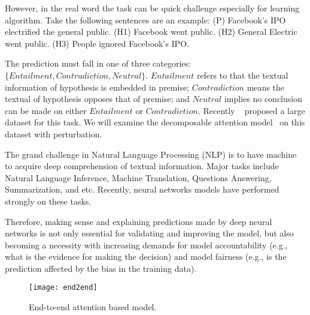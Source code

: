 However, in the real word the task can be quick challenge especially for learning algorithm. Take the following sentences are an example:  (P) Facebook's IPO electrified the general public. (H1) Facebook went public. (H2) General Electric went public. (H3) People ignored Facebook's IPO.

The prediction must fall in one of three categories: $\{Entailment, Contradiction, Neutral\}$.
$Entailment$ refers to that the textual information of hypothesis is embedded in premise;
$Contradiction$ means the textual of hypothesis opposes that of premise;
and $Neutral$ implies no conclusion can be made on either $Entailment$ or $Contradiction$.
%
Recently ~\cite{BowmanAngeliPotts2015} proposed a large dataset for this task. We will examine
the decomposable attention model~\cite{parikh2016emnlp} on this dataset with perturbation.


The grand challenge in Natural Language Processing (NLP) is to have machine to acquire
deep comprehension of textual information. Major tasks include Natural Language Inference,
Machine Translation, Questions Answering, Summarization, and etc.
Recently, neural networks models have performed strongly on these tasks.

Therefore, making sense and explaining predictions made by deep neural networks is not only
essential for validating and improving the model, but also becoming a necessity with
increasing demands for model accountability (e.g., what is the evidence for making the decision)
and model fairness (e.g., is the prediction affected by the bias in the training data).



\begin{figure}[htbp]
\centering
\vspace{-2mm}
 \texttt{[image: end2end]}
 \caption{End-to-end attention based model.}
\label{fig:modelPipeline}
\end{figure}

